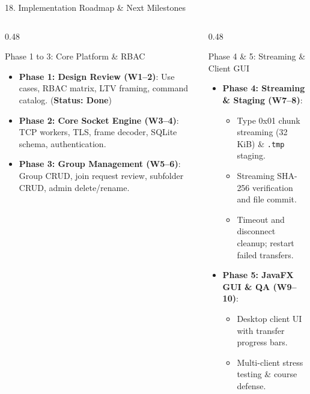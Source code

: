 \documentclass[t, aspectratio=169]{beamer}
\begin{document}
\begin{frame}{18. Implementation Roadmap \& Next Milestones}
\small
\vspace{-2pt}
\begin{columns}[T]
\begin{column}{0.48\textwidth}
\begin{block}{Phase 1 to 3: Core Platform \& RBAC}
\scriptsize
\begin{itemize}
    \setlength{\itemsep}{1.5pt}
    \item \textbf{Phase 1: Design Review (W1--2)}: Use cases, RBAC matrix, LTV framing, command catalog. (\textbf{Status: Done})
    \item \textbf{Phase 2: Core Socket Engine (W3--4)}: TCP workers, TLS, frame decoder, SQLite schema, authentication.
    \item \textbf{Phase 3: Group Management (W5--6)}: Group CRUD, join request review, subfolder CRUD, admin delete/rename.
\end{itemize}
\end{block}
\end{column}

\begin{column}{0.48\textwidth}
\begin{block}{Phase 4 \& 5: Streaming \& Client GUI}
\scriptsize
\begin{itemize}
    \setlength{\itemsep}{1.5pt}
    \item \textbf{Phase 4: Streaming \& Staging (W7--8)}:
    \begin{itemize}
        \setlength{\itemsep}{0.5pt}
        \item Type 0x01 chunk streaming (32 KiB) \& \texttt{.tmp} staging.
        \item Streaming SHA-256 verification and file commit.
        \item Timeout and disconnect cleanup; restart failed transfers.
    \end{itemize}
    \item \textbf{Phase 5: JavaFX GUI \& QA (W9--10)}:
    \begin{itemize}
        \setlength{\itemsep}{0.5pt}
        \item Desktop client UI with transfer progress bars.
        \item Multi-client stress testing \& course defense.
    \end{itemize}
\end{itemize}
\end{block}
\end{column}
\end{columns}
\end{frame}
\end{document}
